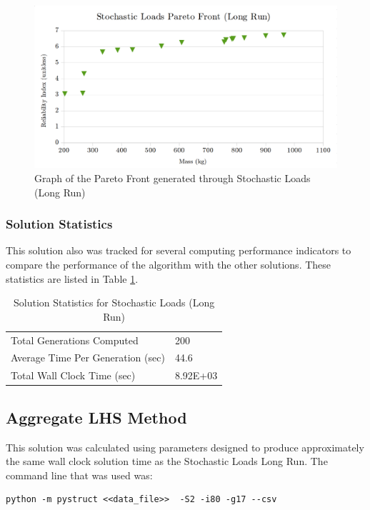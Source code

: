 \begin{figure}
\includegraphics[width=\textwidth]{img/pf_sto_long.png}
	\caption{Graph of the Pareto Front generated through Stochastic Loads (Long Run)}
\label{fig:pfront_sto_long}
\end{figure}

\subsubsection{Solution Statistics}
This solution also was tracked for several computing performance indicators to compare the performance of the algorithm with the other solutions. These statistics are listed in Table \ref{tab:stat_sto_long}. 

\begin{table}[!htbp]
  \centering
  \begin{tabular}{|l|l|}
    \hline
	  Total Generations Computed & 200\\
    Average Time Per Generation (sec) & 44.6\\
    Total Wall Clock Time (sec)	 & 8.92E+03\\
    \hline
  \end{tabular}
	\caption{Solution Statistics for Stochastic Loads (Long Run)}
  \label{tab:stat_sto_long}
\end{table}




\subsection{Aggregate LHS Method}
This solution was calculated using parameters designed to produce approximately the same wall clock solution time as the Stochastic Loads Long Run. The command line that was used was:

\begin{verbatim}
python -m pystruct <<data_file>>  -S2 -i80 -g17 --csv
\end{verbatim}

